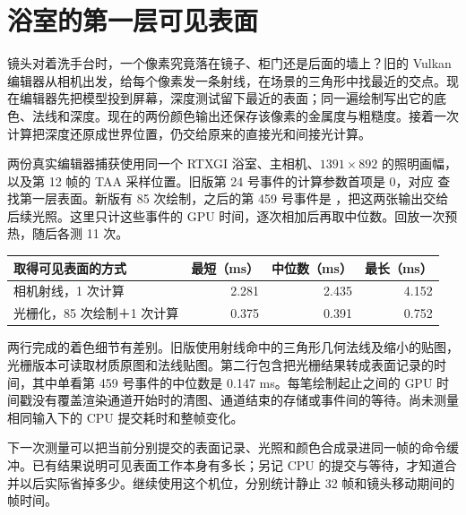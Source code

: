 \clearpage
{}
\section{浴室的第一层可见表面}
镜头对着洗手台时，一个像素究竟落在镜子、柜门还是后面的墙上？旧的 Vulkan 编辑器从相机出发，给每个像素发一条射线，在场景的三角形中找最近的交点。现在编辑器先把模型投到屏幕，深度测试留下最近的表面；同一遍绘制写出它的底色、法线和深度。现在的两份颜色输出还保存该像素的金属度与粗糙度。接着一次计算把深度还原成世界位置，仍交给原来的直接光和间接光计算。

两份真实编辑器捕获使用同一个 RTXGI 浴室、主相机、$1391\times892$ 的照明画幅，以及第 12 帧的 TAA 采样位置。旧版第 24 号事件的计算参数首项是 0，对应  查找第一层表面。新版有 85 次绘制，之后的第 459 号事件是 ，把这两张输出交给后续光照。这里只计这些事件的 GPU 时间，逐次相加后再取中位数。回放一次预热，随后各测 11 次。

\begin{center}\smalltable
\begin{tabular}{lrrr}
\toprule
取得可见表面的方式 & 最短（ms）& 中位数（ms）& 最长（ms）\\
\midrule
相机射线，1 次计算 & 2.281 & 2.435 & 4.152\\
光栅化，85 次绘制＋1 次计算 & 0.375 & 0.391 & 0.752\\
\bottomrule
\end{tabular}
\end{center}

两行完成的着色细节有差别。旧版使用射线命中的三角形几何法线及缩小的贴图，光栅版本可读取材质原图和法线贴图。第二行包含把光栅结果转成表面记录的时间，其中单看第 459 号事件的中位数是 0.147 ms。每笔绘制起止之间的 GPU 时间戳没有覆盖渲染通道开始时的清图、通道结束的存储或事件间的等待。尚未测量相同输入下的 CPU 提交耗时和整帧变化。

下一次测量可以把当前分别提交的表面记录、光照和颜色合成录进同一帧的命令缓冲。已有结果说明可见表面工作本身有多长；另记 CPU 的提交与等待，才知道合并以后实际省掉多少。继续使用这个机位，分别统计静止 32 帧和镜头移动期间的帧时间。

